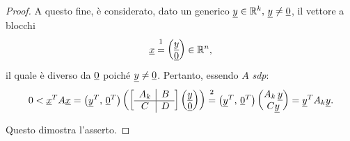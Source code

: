 \begin{proof}
    A questo fine, è considerato, dato un generico $\uline y\in\mathbb R^k,\,\uline y\neq \uline 0$, il vettore a blocchi
    \begin{equation*}
    	\uline x\overset{\footnotemark}{=}
    	\begin{pmatrix}
    		\uline y\\
    		\uline 0
    	\end{pmatrix}\in\mathbb R^n,
    \end{equation*}
    il quale è diverso da $\uline 0$ poiché $\uline y\neq\uline 0$. Pertanto, essendo $A$ \textit{sdp}:
    \begin{equation*}
        0<\uline x^T A\uline x=\left(\uline y^T,\, \uline 0^T\right)\left(\left[
        \begin{array}{c|c}
            A_k & B\\
            \hline
            C & D
        \end{array}\right]\begin{pmatrix}
            \uline y\\
            \uline 0
        \end{pmatrix}\right)
        \overset{\footnotemark}{=}\left(\uline y^T,\,\uline 0^T\right)
        \begin{pmatrix}
            A_k\, \uline y\\
            C\uline y
        \end{pmatrix}=\uline y^T A_k \uline y.
    \end{equation*}

    Questo dimostra l'asserto.
\end{proof}

\addtocounter{footnote}{-1}


